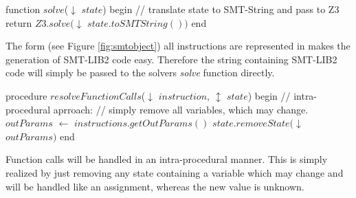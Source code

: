 \begin{program}[h!]
	\begin{GenericCode}
function $solve$($\downarrow$ $state$) begin
	// translate state to SMT-String and pass to Z3
	return $Z3.solve($$\downarrow$ $state.toSMTString())$
end\end{GenericCode}
	\caption{The form (see Figure \ref{fig:smtobject}) all instructions are represented in makes the generation of SMT-LIB2 code easy. Therefore the string containing SMT-LIB2 code will simply be passed to the solvers \emph{solve} function directly.}
\label{code:z3 solver}
\end{program}
\begin{program}[h!]
	\begin{GenericCode}
procedure $resolveFunctionCalls$($\downarrow$ $instruction$, $\updownarrow$ $state$) begin
	// intra-procedural aprroach:
	// simply remove all variables, which may change.
	$outParams$ $\leftarrow$ $instructions.getOutParams()$
	$state.removeState($$\downarrow$ $outParams$$)$
end	\end{GenericCode}
	\caption{Function calls will be handled in an intra-procedural manner. This is simply realized by just removing any state containing a variable which may change and will be handled like an assignment, whereas the new value is unknown. }
	\label{code:intraprocedural analysis}
\end{program}
